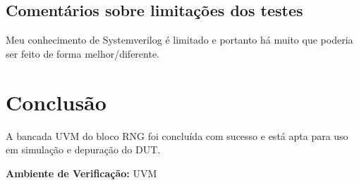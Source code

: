 \documentclass[12pt, a4paper]{article}
\begin{document}
	\subsection{Comentários sobre limitações dos testes}
	Meu conhecimento de Systemverilog é limitado e portanto há muito que poderia ser feito de forma melhor/diferente.
	
	\section{Conclusão}
	A bancada UVM do bloco RNG foi concluída com sucesso e está apta para uso em simulação e depuração do DUT.
	
	\vfill
	\begin{center}
		\textbf{Ambiente de Verificação:} UVM
	\end{center}
	
\end{document}
